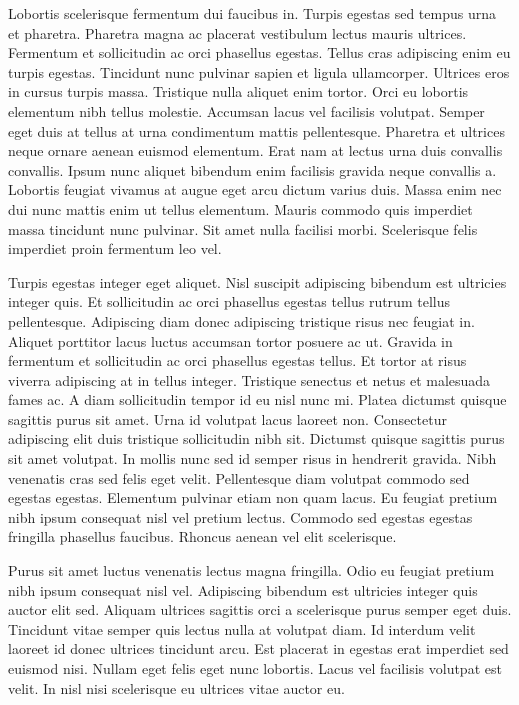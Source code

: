 \documentclass[11pt,a4paper]{article}
\begin{document}
Lobortis scelerisque fermentum dui faucibus in. Turpis egestas sed tempus urna et pharetra. Pharetra magna ac placerat vestibulum lectus mauris ultrices. Fermentum et sollicitudin ac orci phasellus egestas. Tellus cras adipiscing enim eu turpis egestas. Tincidunt nunc pulvinar sapien et ligula ullamcorper. Ultrices eros in cursus turpis massa. Tristique nulla aliquet enim tortor. Orci eu lobortis elementum nibh tellus molestie. Accumsan lacus vel facilisis volutpat. Semper eget duis at tellus at urna condimentum mattis pellentesque. Pharetra et ultrices neque ornare aenean euismod elementum. Erat nam at lectus urna duis convallis convallis. Ipsum nunc aliquet bibendum enim facilisis gravida neque convallis a. Lobortis feugiat vivamus at augue eget arcu dictum varius duis. Massa enim nec dui nunc mattis enim ut tellus elementum. Mauris commodo quis imperdiet massa tincidunt nunc pulvinar. Sit amet nulla facilisi morbi. Scelerisque felis imperdiet proin fermentum leo vel.

Turpis egestas integer eget aliquet. Nisl suscipit adipiscing bibendum est ultricies integer quis. Et sollicitudin ac orci phasellus egestas tellus rutrum tellus pellentesque. Adipiscing diam donec adipiscing tristique risus nec feugiat in. Aliquet porttitor lacus luctus accumsan tortor posuere ac ut. Gravida in fermentum et sollicitudin ac orci phasellus egestas tellus. Et tortor at risus viverra adipiscing at in tellus integer. Tristique senectus et netus et malesuada fames ac. A diam sollicitudin tempor id eu nisl nunc mi. Platea dictumst quisque sagittis purus sit amet. Urna id volutpat lacus laoreet non. Consectetur adipiscing elit duis tristique sollicitudin nibh sit. Dictumst quisque sagittis purus sit amet volutpat. In mollis nunc sed id semper risus in hendrerit gravida. Nibh venenatis cras sed felis eget velit. Pellentesque diam volutpat commodo sed egestas egestas. Elementum pulvinar etiam non quam lacus. Eu feugiat pretium nibh ipsum consequat nisl vel pretium lectus. Commodo sed egestas egestas fringilla phasellus faucibus. Rhoncus aenean vel elit scelerisque.

Purus sit amet luctus venenatis lectus magna fringilla. Odio eu feugiat pretium nibh ipsum consequat nisl vel. Adipiscing bibendum est ultricies integer quis auctor elit sed. Aliquam ultrices sagittis orci a scelerisque purus semper eget duis. Tincidunt vitae semper quis lectus nulla at volutpat diam. Id interdum velit laoreet id donec ultrices tincidunt arcu. Est placerat in egestas erat imperdiet sed euismod nisi. Nullam eget felis eget nunc lobortis. Lacus vel facilisis volutpat est velit. In nisl nisi scelerisque eu ultrices vitae auctor eu.
\end{document}
